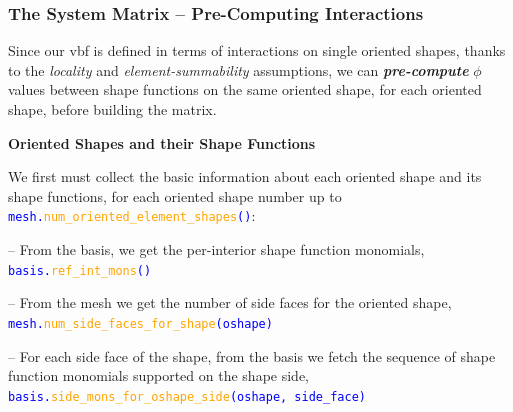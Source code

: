 \documentclass[compress]{beamer}
\begin{document}
\begin{frame}
  \frametitle{The System Matrix -- Pre-Computing Interactions}
  
  Since our vbf is defined in terms of interactions on single oriented shapes, thanks to the \emph{locality} and
  \emph{element-summability} assumptions, we can \emph{\textbf{pre-compute}}  $\phi$ values between
  shape functions on the same oriented shape, for each oriented shape, before building the matrix.
  
  \pause
  \vspace{.2cm}
  \textbf{Oriented Shapes and their Shape Functions}
 
  \vspace{.1cm}
  We first must collect the basic information about each oriented shape and its shape functions, for each oriented shape number up to
  \texttt{\small \textcolor{blue}{mesh.\textcolor{orange}{num\_oriented\_element\_shapes}()}}:
  \vspace{.15cm}

  \pause
  -- From the basis, we get the per-interior shape function monomials,\\ 
  \hspace{0.5cm}\texttt{\small \textcolor{blue}{basis.\textcolor{orange}{ref\_int\_mons}()}}
    
  \pause
  -- From the mesh we get the number of side faces for the oriented shape,\\ 
  \hspace{0.5cm}\texttt{\small \textcolor{blue}{mesh.\textcolor{orange}{num\_side\_faces\_for\_shape}(oshape)}}

  \pause
  -- For each side face of the shape, from the basis we fetch the sequence of shape function monomials supported on the shape side,\\
  \hspace{0.5cm}\texttt{\small \textcolor{blue}{basis.\textcolor{orange}{side\_mons\_for\_oshape\_side}(oshape, side\_face)}}
\end{frame}
\end{document}
